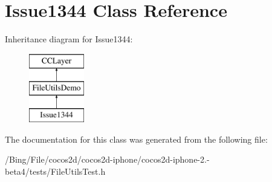 \hypertarget{interface_issue1344}{\section{Issue1344 Class Reference}
\label{interface_issue1344}
}
Inheritance diagram for Issue1344\-:\begin{figure}[H]
\begin{center}
\leavevmode
\includegraphics[height=3.000000cm]{interface_issue1344}
\end{center}
\end{figure}


The documentation for this class was generated from the following file\-:\begin{DoxyCompactItemize}
\item 
/\-Bing/\-File/cocos2d/cocos2d-\/iphone/cocos2d-\/iphone-\/2.-\/beta4/tests/File\-Utils\-Test.\-h\end{DoxyCompactItemize}
